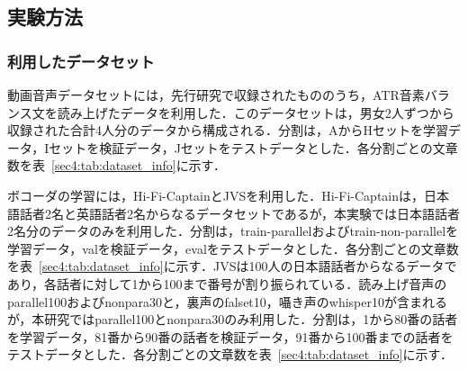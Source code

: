 \subsection{実験方法}
\subsubsection{利用したデータセット}
動画音声データセットには，先行研究\cite{taguchi,esaki}で収録されたもののうち，ATR音素バランス文\cite{atr}を読み上げたデータを利用した．このデータセットは，男女2人ずつから収録された合計4人分のデータから構成される．分割は，AからHセットを学習データ，Iセットを検証データ，Jセットをテストデータとした．各分割ごとの文章数を表~\ref{sec4:tab:dataset_info}に示す．

ボコーダの学習には，Hi-Fi-Captain\cite{okamoto2023hi}とJVS\cite{takamichi2019jvs}を利用した．Hi-Fi-Captainは，日本語話者2名と英語話者2名からなるデータセットであるが，本実験では日本語話者2名分のデータのみを利用した．分割は，train-parallelおよびtrain-non-parallelを学習データ，valを検証データ，evalをテストデータとした．各分割ごとの文章数を表~\ref{sec4:tab:dataset_info}に示す．JVSは100人の日本語話者からなるデータであり，各話者に対して1から100まで番号が割り振られている．読み上げ音声のparallel100およびnonpara30と，裏声のfalset10，囁き声のwhisper10が含まれるが，本研究ではparallel100とnonpara30のみ利用した．分割は，1から80番の話者を学習データ，81番から90番の話者を検証データ，91番から100番までの話者をテストデータとした．各分割ごとの文章数を表~\ref{sec4:tab:dataset_info}に示す．

\begin{table*}[bt]
    \centering
    \caption{利用したデータセットの文章数}
    \label{sec4:tab:dataset_info}
    \begin{center}
        \renewcommand{\arraystretch}{0.9} %
        \setlength{\tabcolsep}{8pt}      %
    \end{center}
\end{table*}

